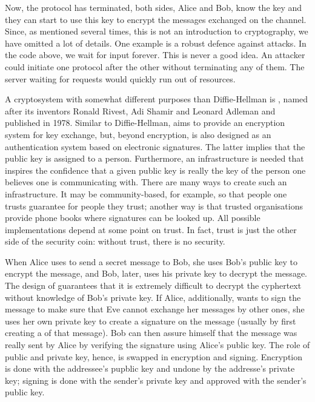 \documentclass{scrreprt}
\begin{document}
Now, the protocol has terminated, both sides,
Alice and Bob, know the key and they can start
to use this key to encrypt the messages
exchanged on the channel.
Since, as mentioned several times,
this is not an introduction to cryptography,
we have omitted a lot of details.
One example is a robust defence against
 attacks.
In the code above, we wait for input forever.
This is never a good idea.
An attacker could initiate one protocol after the other
without terminating any of them. 
The server waiting for requests
would quickly run out of resources.


A cryptosystem with somewhat different
purposes than Diffie-Hellman is ,
named after its inventors Ronald Rivest,
Adi Shamir and Leonard Adleman and published in 1978.
Similar to Diffie-Hellman,  aims
to provide an encryption system for key exchange,
but, beyond encryption,  is also designed
as an authentication system 
based on electronic signatures.
The latter implies that the public key is 
assigned to a person.
Furthermore, an infrastructure is needed
that inspires the confidence that a given 
public key is really the key of the person
one believes one is communicating with.
There are many ways to create such an infrastructure.
It may be community-based, for example,
so that people one trusts guarantee for people
they trust; another way is that trusted organisations
provide phone books where signatures can be looked up.
All possible implementations depend at some point
on trust. In fact, trust is just the other side
of the security coin: without trust,
there is no security.

When Alice uses  to send a secret message
to Bob, she uses Bob's public key to encrypt the message,
and Bob, later, uses his private key to decrypt the message.
The design of  guarantees that it is 
extremely difficult to decrypt the cyphertext without
knowledge of Bob's private key.
If Alice, additionally, wants to sign the message
to make sure that Eve cannot exchange her messages
by other ones, she uses her own private key
to create a signature on the message (usually 
by first creating a  of that message).
Bob can then assure himself that the message
was really sent by Alice by verifying the signature
using Alice's public key.
The role of public and private key, hence,
is swapped in encryption and signing.
Encryption is done with the addressee's
pupblic key and undone by the addresse's private key;
signing is done with the sender's private key
and approved with the sender's public key.
\end{document}
